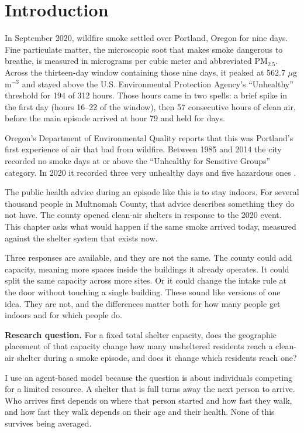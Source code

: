 \documentclass[graybox]{svmult}
\begin{document}
\section{Introduction}
\label{sec:intro}

In September 2020, wildfire smoke settled over Portland, Oregon for nine days.
Fine particulate matter, the microscopic soot that makes smoke dangerous to
breathe, is measured in micrograms per cubic meter and abbreviated PM$_{2.5}$.
Across the thirteen-day window containing those nine days, it peaked at 562.7
$\mu$g\,m$^{-3}$ and stayed above the U.S. Environmental Protection Agency's
``Unhealthy'' threshold for 194 of 312 hours. Those hours came in two spells:
a brief spike in the first day (hours 16--22 of the window), then 57 consecutive
hours of clean air, before the main episode arrived at hour 79 and held for
days.

Oregon's Department of Environmental Quality reports that this was Portland's
first experience of air that bad from wildfire. Between 1985 and 2014 the city
recorded no smoke days at or above the ``Unhealthy for Sensitive Groups''
category. In 2020 it recorded three very unhealthy days and five hazardous ones
\cite{deq2023}.

The public health advice during an episode like this is to stay indoors. For
several thousand people in Multnomah County, that advice describes something they
do not have. The county opened clean-air shelters in response to the 2020 event.
This chapter asks what would happen if the same smoke arrived today, measured
against the shelter system that exists now.

Three responses are available, and they are not the same. The county could add
capacity, meaning more spaces inside the buildings it already operates. It
could split the same capacity across more sites. Or it could change the intake
rule at the door without touching a single building. These sound like versions
of one idea. They are not, and the differences matter both for how many people
get indoors and for which people do.

\textbf{Research question.} For a fixed total shelter capacity, does the
geographic placement of that capacity change how many unsheltered residents reach
a clean-air shelter during a smoke episode, and does it change which residents
reach one?

I use an agent-based model because the question is about individuals competing
for a limited resource. A shelter that is full turns away the next person to
arrive. Who arrives first depends on where that person started and how fast they
walk, and how fast they walk depends on their age and their health. None of this
survives being averaged.
\end{document}
